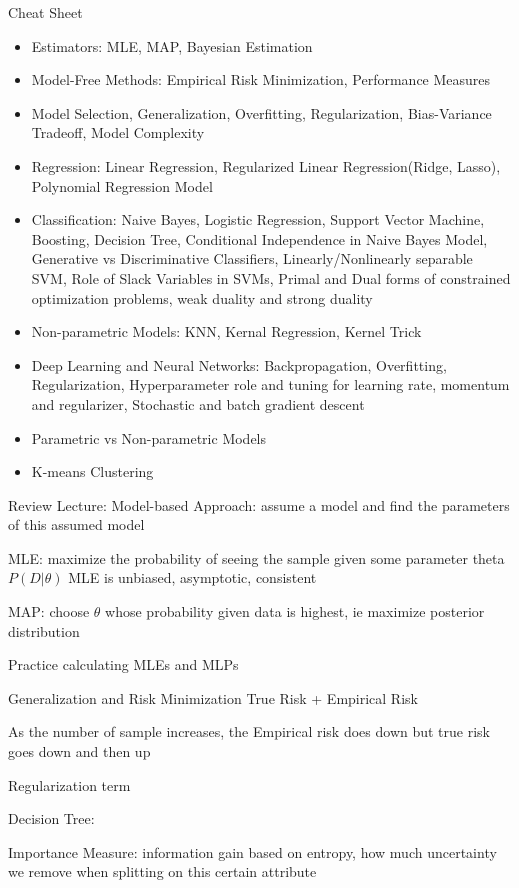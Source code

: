 \documentclass{article}
\begin{document}
Cheat Sheet
\begin{itemize}
\item Estimators: MLE, MAP, Bayesian Estimation
\item Model-Free Methods: Empirical Risk Minimization, Performance Measures
\item Model Selection, Generalization, Overfitting, Regularization, Bias-Variance Tradeoff, Model Complexity
\item Regression: Linear Regression, Regularized Linear Regression(Ridge, Lasso), Polynomial Regression Model
\item Classification: Naive Bayes, Logistic Regression, Support Vector Machine, Boosting, Decision Tree, Conditional Independence in Naive Bayes Model, Generative vs Discriminative Classifiers, Linearly/Nonlinearly separable SVM, Role of Slack Variables in SVMs, Primal and Dual forms of constrained optimization problems, weak duality and strong duality
\item Non-parametric Models: KNN, Kernal Regression, Kernel Trick
\item Deep Learning and Neural Networks: Backpropagation, Overfitting, Regularization, Hyperparameter role and tuning for learning rate, momentum and regularizer, Stochastic and batch gradient descent
\item Parametric vs Non-parametric Models
\item K-means Clustering 
\end{itemize}






Review Lecture:
Model-based Approach: assume a model and find the parameters of this assumed model

MLE: maximize the probability of seeing the sample given some parameter theta $P(D|\theta)$
MLE is unbiased, asymptotic, consistent

MAP: choose $\theta$ whose probability given data is highest, ie maximize posterior distribution

Practice calculating MLEs and MLPs

Generalization and Risk Minimization
True Risk + Empirical Risk

As the number of sample increases, the Empirical risk does down but true risk goes down and then up

Regularization term



Decision Tree:

Importance Measure: information gain based on entropy, how much uncertainty we remove when splitting on this certain attribute
\end{document}
